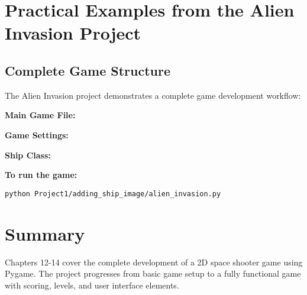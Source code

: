 \section*{Practical Examples from the Alien Invasion Project}

\subsection*{Complete Game Structure}
The Alien Invasion project demonstrates a complete game development workflow:

\textbf{Main Game File:}


\textbf{Game Settings:}


\textbf{Ship Class:}


\textbf{To run the game:}
\begin{verbatim}
python Project1/adding_ship_image/alien_invasion.py
\end{verbatim}

\section*{Summary}
Chapters 12-14 cover the complete development of a 2D space shooter game using Pygame. The project progresses from basic game setup to a fully functional game with scoring, levels, and user interface elements.

